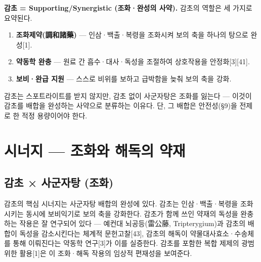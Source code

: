 \documentclass[11pt,oneside]{book}
\begin{document}
\vspace{2pt}\vspace{3pt}

\textbf{감초 = Supporting/Synergistic (조화·완성의 사약).} 감초의 역할은 세 가지로 요약된다.

\begin{enumerate}[leftmargin=6mm,itemsep=1pt,topsep=2pt]
  \item \textbf{조화제약(調和諸藥)} — 인삼·백출·복령을 조화시켜 보의 축을 하나의 탕으로 완성[1].
  \item \textbf{약동학 완충} — 원료 간 흡수·대사·독성을 조절하여 상호작용을 안정화[3][41].
  \item \textbf{보비·완급 지원} — 스스로 비위를 보하고 급박함을 늦춰 보의 축을 강화.
\end{enumerate}
감초는 스포트라이트를 받지 않지만, 감초 없이 사군자탕은 조화를 잃는다 — 이것이 감초를 배합을 완성하는 사약으로 분류하는 이유다. 단, 그 배합은 안전성(§9)을 전제로 한 적정 용량이어야 한다.

\section{시너지 — 조화와 해독의 약재}
\subsection{감초 × 사군자탕 (조화)}
감초의 핵심 시너지는 사군자탕 배합의 완성에 있다. 감초는 인삼·백출·복령을 조화시키는 동시에 보비익기로 보의 축을 강화한다. 감초가 함께 쓰인 약재의 독성을 완충하는 작용은 잘 연구되어 있다 — 예컨대 뇌공등(雷公藤, Tripterygium)과 감초의 배합이 독성을 감소시킨다는 체계적 문헌고찰[43], 감초의 해독이 약물대사효소·수송체를 통해 이뤄진다는 약동학 연구[3]가 이를 실증한다. 감초를 포함한 복합 제제의 광범위한 활용[1]은 이 조화·해독 작용의 임상적 편재성을 보여준다.
\end{document}
